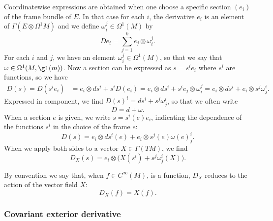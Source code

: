 Coordinatewise expressions are obtained when one choose a specific section $(e_i)$ of the frame bundle of $E$. In that case for each $i$, the derivative $e_i$ is an element of $\Gamma(E\otimes\Omega^1M)$ and we define $\omega_i^j\in\Omega^1(M)$ by
\begin{equation}
	De_i=\sum_{j=1}^ke_j\otimes \omega_i^j.
\end{equation}
For each $i$ and $j$, we have an element $\omega_i^j\in\Omega^1(M)$, so that we say that $\omega\in\Omega^1(M,\gl(m))$. Now a section can be expressed as $s=s^ie_i$ where $s^i$ are functions, so we have
\begin{align}
	D(s)=D(s^ie_i) & =e_i\otimes ds^i+s^iD(e_i)=e_i\otimes ds^i+s^ie_j\otimes \omega_i^j=e_i\otimes ds^i+e_i\otimes s^j\omega_j^i.
\end{align}
Expressed in component, we find $D(s)^i=ds^i+s^j\omega_j^i$, so that we often write
\begin{equation}
	D=d+\omega.
\end{equation}
When a section $e$ is given, we write $s=s^i(e)e_i$, indicating the dependence of the functions $s^i$ in the choice of the frame $e$:
\[
	D(s)=e_i\otimes ds^i(e)+e_i\otimes s^j(e)\omega(e)_j^i.
\]
When we apply both sides to a vector $X\in\Gamma(TM)$, we find
\begin{equation}
	D_X(s)=e_i\otimes\Big( X(s^i)+s^j\omega^i_j(X) \Big).
\end{equation}

By convention we say that, when $f\in C^{\infty}(M)$, is a function, $D_X$ reduces to the action of the vector field $X$:
\begin{equation}
	D_X(f)=X(f).
\end{equation}


\subsubsection{Covariant exterior derivative}

